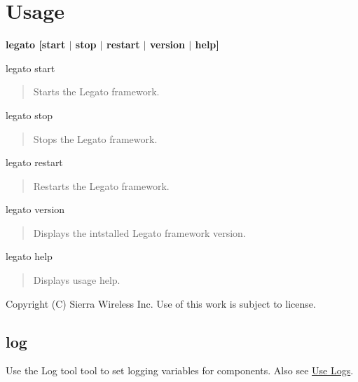 \section*{Usage}

{\bfseries {\ttfamily  legato \mbox{[}start $\vert$ stop $\vert$ restart $\vert$ version $\vert$ help\mbox{]}}}

\begin{DoxyVerb}legato start \end{DoxyVerb}


\begin{quote}
Starts the Legato framework. \end{quote}


\begin{DoxyVerb}legato stop \end{DoxyVerb}


\begin{quote}
Stops the Legato framework. \end{quote}


\begin{DoxyVerb}legato restart \end{DoxyVerb}


\begin{quote}
Restarts the Legato framework. \end{quote}


\begin{DoxyVerb}legato version \end{DoxyVerb}


\begin{quote}
Displays the intstalled Legato framework version. \end{quote}


\begin{DoxyVerb}legato help \end{DoxyVerb}


\begin{quote}
Displays usage help. \end{quote}






Copyright (C) Sierra Wireless Inc. Use of this work is subject to license. \hypertarget{toolsTarget_log}{}\subsection{log}\label{toolsTarget_log}
Use the Log tool tool to set logging variables for components. Also see \hyperlink{howToLogs}{Use Logs}.

